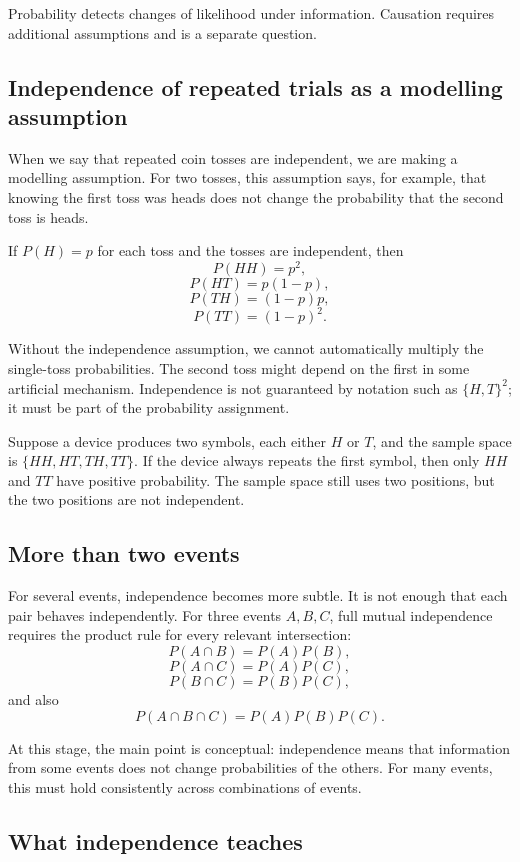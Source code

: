 Probability detects changes of likelihood under information. Causation requires
additional assumptions and is a separate question.

\subsection*{Independence of repeated trials as a modelling assumption}

When we say that repeated coin tosses are independent, we are making a modelling
assumption. For two tosses, this assumption says, for example, that knowing the
first toss was heads does not change the probability that the second toss is
heads.

If \(P(H)=p\) for each toss and the tosses are independent, then
\[
P(HH)=p^2,
\]
\[
P(HT)=p(1-p),
\]
\[
P(TH)=(1-p)p,
\]
\[
P(TT)=(1-p)^2.
\]

Without the independence assumption, we cannot automatically multiply the
single-toss probabilities. The second toss might depend on the first in some
artificial mechanism. Independence is not guaranteed by notation such as
\(\{H,T\}^2\); it must be part of the probability assignment.

\begin{examplebox}
Suppose a device produces two symbols, each either \(H\) or \(T\), and the sample
space is \(\{HH,HT,TH,TT\}\). If the device always repeats the first symbol, then
only \(HH\) and \(TT\) have positive probability. The sample space still uses two
positions, but the two positions are not independent.
\end{examplebox}

\subsection*{More than two events}

For several events, independence becomes more subtle. It is not enough that each
pair behaves independently. For three events \(A,B,C\), full mutual independence
requires the product rule for every relevant intersection:
\[
P(A\cap B)=P(A)P(B),
\]
\[
P(A\cap C)=P(A)P(C),
\]
\[
P(B\cap C)=P(B)P(C),
\]
and also
\[
P(A\cap B\cap C)=P(A)P(B)P(C).
\]

At this stage, the main point is conceptual: independence means that information
from some events does not change probabilities of the others. For many events,
this must hold consistently across combinations of events.

\subsection*{What independence teaches}

